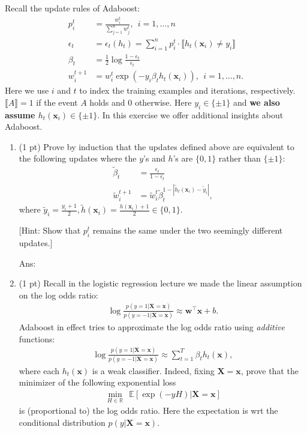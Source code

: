 \documentclass[10pt,letter,notitlepage]{article}
\newcommand{\pred}[1]{\llbracket#1\rrbracket}
\newcommand{\RR}{\mathds{R}}
\newcommand{\wv}{\mathbf{w}}
\newcommand{\xv}{\mathbf{x}}
\newcommand{\Xv}{\mathbf{X}}
\newcommand{\EE}{\mathds{E}}
\newcommand{\ans}[1]{{\color{orange}\textsf{Ans}: #1}}
\newcounter{exercise}
\begin{document}
\begin{exercise}

	Recall the update rules of Adaboost:
	\begin{align}
	p^t_i &= \frac{w^t_i}{\sum_{j=1}^n w^t_j},  ~~ i=1, \ldots, n \\
	\label{eq:eps} \epsilon_t &= \epsilon_t(h_t) = \sum_{i=1}^n p^t_i \cdot \pred{h_t(\xv_i) \ne y_i} \\
	\label{eq:beta}\beta_t &= \frac12\log\frac{1-\epsilon_t}{\epsilon_t} \\
	\label{eq:w} w^{t+1}_i&= w^t_i \exp(- y_i \beta_t h_t(\xv_i) ),  ~~ i=1, \ldots, n.
	\end{align}
	Here we use $i$ and $t$ to index the training examples and iterations, respectively. $\pred{A} = 1$ if the event $A$ holds and 0 otherwise. Here $y_i \in \{\pm 1\}$ and \textbf{we also assume $h_t(\xv_i) \in \{\pm 1\}$}.
	In this exercise we offer additional insights about Adaboost.

	\begin{enumerate}[label=\alph*)]
    \item (1 pt) Prove by induction that the updates defined above are equivalent to the following updates where the $y$'s and $h$'s are $\{0, 1\}$ rather than $\{\pm 1\}$:
		\begin{align}
		\tilde\beta_t &= \frac{\epsilon_t}{1-\epsilon_t} \\
		\tilde w^{t+1}_i & = \tilde w^t_i \tilde\beta_t^{1-|\tilde h_t(\xv_i) - \tilde y_i|},
		\end{align}
		where $\tilde y_i = \tfrac{y_i+1}{2}, \tilde h(\xv_i) = \tfrac{h(\xv_i)+1}{2} \in \{ 0,1\}$.

		[Hint: Show that $p_i^t$ remains the same under the two seemingly different updates.]

\ans{} 
		\item (1 pt) Recall in the logistic regression lecture we made the linear assumption on the log odds ratio:
		\begin{align}
		\log\frac{p(y=1 | \Xv = \xv)}{p(y=-1 | \Xv = \xv)} \approx \wv^\top \xv + b.
		\end{align}
		Adaboost in effect tries to approximate the log odds ratio using \emph{additive} functions:
		\begin{align}
		\log\frac{p(y=1 | \Xv = \xv)}{p(y=-1 | \Xv = \xv)} \approx \sum_{t=1}^T \beta_t h_t(\xv),
		\end{align}
		where each $h_t(\xv)$ is a weak classifier. Indeed, fixing $\Xv = \xv$, prove that the minimizer of the following exponential loss
		\begin{align}
		\label{eq:exp}
		\min_{H\in \RR} ~~ \EE[ \exp(- y H) | \Xv = \xv ]
		\end{align}
		is (proportional to) the log odds ratio. Here the expectation is wrt the conditional distribution $p(y | \Xv = \xv)$.


\end{enumerate}
\end{exercise}
\end{document}
